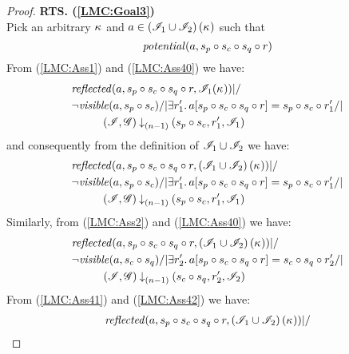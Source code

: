 \begin{lemma}
\begin{proof}
\noindent\textbf{RTS. (\ref{LMC:Goal3})}\\
Pick an arbitrary $\kappa_{}$ and $a \in \left(\mathscr{I}_{1} \cup \mathscr{I}_{2} \right)(\kappa_{})$ such that
\begin{equation}
	\mathit{potential}(a, s_p \circ s_c \circ s_q \circ r) \label{LMC:Ass40}
\end{equation}
From (\ref{LMC:Ass1}) and (\ref{LMC:Ass40}) we have: 
%
\begin{align*}
	&\m{reflected}(a,s_p \composeL s_c \composeL s_q \composeL r,\lmod_{1}(\ca{})) |/\null \\
%  
  &\neg\m{visible}(a,s_p \composeL s_c) /| \exsts{r'_1}a[s_p \composeL s_c \composeL s_q \composeL r] = s_p \composeL s_c \composeL r'_1 /| \\
  &\hspace{1cm}\extendsAMUptob{\lmod, \gmod}{(n-1)}{s_p \composeL s_c, r'_1}{\lmod_{1}}
\end{align*}
%
and consequently from the definition of $\mathscr{I}_1 \cup \mathscr{I}_2$ we have: 
%
\begin{align}
	&\m{reflected}(a,s_p \composeL s_c \composeL s_q \composeL r, \left( \lmod_{1} \cup \lmod_2 \right) (\ca{})) |/\null \nonumber \\
%  
  &\neg\m{visible}(a,s_p \composeL s_c) /| \exsts{r'_1}a[s_p \composeL s_c \composeL s_q \composeL r] = s_p \composeL s_c \composeL r'_1 /| \nonumber\\
  &\hspace{1cm}\extendsAMUptob{\lmod, \gmod}{(n-1)}{s_p \composeL s_c, r'_1}{\lmod_{1}} \label{LMC:Ass41}
\end{align}
Similarly, from (\ref{LMC:Ass2}) and (\ref{LMC:Ass40}) we have: 
%
\begin{align}
	&\m{reflected}(a,s_p \composeL s_c \composeL s_q \composeL r, \left(\lmod_1 \cup \lmod_{2}\right)(\ca{})) |/\null \nonumber \\
%  
  &\neg\m{visible}(a,s_c \composeL s_q) /| \exsts{r'_2}a[s_p \composeL s_c \composeL s_q \composeL r] = s_c \composeL s_q \composeL r'_2 /| \nonumber\\
  &\hspace{1cm}\extendsAMUptob{\lmod, \gmod}{(n-1)}{s_c \composeL s_q, r'_2}{\lmod_{2}} \label{LMC:Ass42}
\end{align}
From (\ref{LMC:Ass41}) and (\ref{LMC:Ass42}) we have: 
%
\begin{align}
	&\m{reflected}(a,s_p \composeL s_c \composeL s_q \composeL r, \left(\lmod_1 \cup \lmod_{2}\right)(\ca{})) |/\null \nonumber \\

\end{align}
\end{proof}
\end{lemma}
